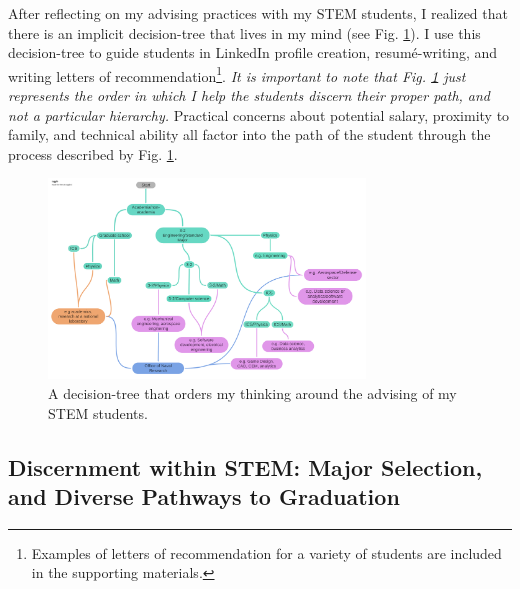 \documentclass[../../../main.tex]{subfiles}
\begin{document}
After reflecting on my advising practices with my STEM students, I realized that there is an implicit decision-tree that lives in my mind (see Fig. \ref{fig:tree}).  I use this decision-tree to guide students in LinkedIn profile creation, resum\'{e}-writing, and writing letters of recommendation\footnote{Examples of letters of recommendation for a variety of students are included in the supporting materials.}.  \textit{It is important to note that Fig. \ref{fig:tree} just represents the order in which I help the students discern their proper path, and not a particular hierarchy.}  Practical concerns about potential salary, proximity to family, and technical ability all factor into the path of the student through the process described by Fig. \ref{fig:tree}.

\begin{figure}
\centering
\includegraphics[width=0.75\textwidth]{figures/Advising_tree.pdf}
\caption{\label{fig:tree} A decision-tree that orders my thinking around the advising of my STEM students.}
\end{figure}

\subsection{Discernment within STEM: Major Selection, and Diverse Pathways to Graduation}
\end{document}
